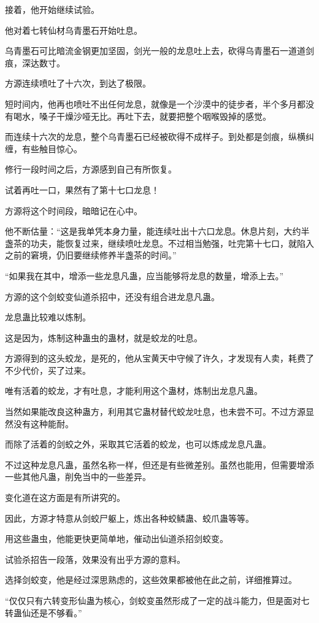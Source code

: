 \begin{this_body}
接着，他开始继续试验。

他对着七转仙材乌青墨石开始吐息。

乌青墨石可比暗流金钢更加坚固，剑光一般的龙息吐上去，砍得乌青墨石一道道剑痕，深达数寸。

方源连续喷吐了十六次，到达了极限。

短时间内，他再也喷吐不出任何龙息，就像是一个沙漠中的徒步者，半个多月都没有喝水，嗓子干燥沙哑无比。再吐下去，就要把整个咽喉毁掉的感觉。

而连续十六次的龙息，整个乌青墨石已经被砍得不成样子。到处都是剑痕，纵横纠缠，有些触目惊心。

修行一段时间之后，方源感到自己有所恢复。

试着再吐一口，果然有了第十七口龙息！

方源将这个时间段，暗暗记在心中。

他不断估量：“这是我单凭本身力量，能连续吐出十六口龙息。休息片刻，大约半盏茶的功夫，能恢复过来，继续喷吐龙息。不过相当勉强，吐完第十七口，就陷入之前的窘境，仍旧要继续修养半盏茶的时间。”

“如果我在其中，增添一些龙息凡蛊，应当能够将龙息的数量，增添上去。”

方源的这个剑蛟变仙道杀招中，还没有组合进龙息凡蛊。

龙息蛊比较难以炼制。

这是因为，炼制这种蛊虫的蛊材，就是蛟龙的吐息。

方源得到的这头蛟龙，是死的，他从宝黄天中守候了许久，才发现有人卖，耗费了不少代价，买了过来。

唯有活着的蛟龙，才有吐息，才能利用这个蛊材，炼制出龙息凡蛊。

当然如果能改良这种蛊方，利用其它蛊材替代蛟龙吐息，也未尝不可。不过方源显然没有这种能耐。

而除了活着的剑蛟之外，采取其它活着的蛟龙，也可以炼成龙息凡蛊。

不过这种龙息凡蛊，虽然名称一样，但还是有些微差别。虽然也能用，但需要增添一些其他凡蛊，削免当中的一些差异。

变化道在这方面是有所讲究的。

因此，方源才特意从剑蛟尸躯上，炼出各种蛟鳞蛊、蛟爪蛊等等。

用这些蛊虫，他能更快更简单地，催动出仙道杀招剑蛟变。

试验杀招告一段落，效果没有出乎方源的意料。

选择剑蛟变，他是经过深思熟虑的，这些效果都被他在此之前，详细推算过。

“仅仅只有六转变形仙蛊为核心，剑蛟变虽然形成了一定的战斗能力，但是面对七转蛊仙还是不够看。”


\end{this_body}
